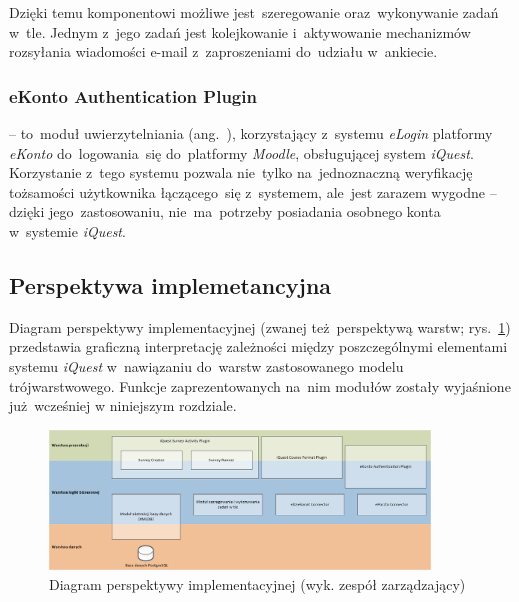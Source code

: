 Dzięki temu komponentowi możliwe jest~szeregowanie oraz~wykonywanie zadań w~tle. Jednym z~jego zadań jest kolejkowanie i~aktywowanie mechanizmów rozsyłania wiadomości e-mail z~zaproszeniami do~udziału w~ankiecie.

\subsubsection{eKonto Authentication Plugin}
\label{Chapter5425}

 -- to~moduł uwierzytelniania (ang.~), korzystający z~systemu \textit{eLogin} platformy \textit{eKonto} do~logowania~się do~platformy \textit{Moodle}, obsługującej system \textit{iQuest}. Korzystanie z~tego systemu pozwala nie~tylko na~jednoznaczną weryfikację tożsamości użytkownika łączącego~się z~systemem, ale~jest zarazem wygodne -- dzięki jego~zastosowaniu, nie~ma~potrzeby posiadania osobnego konta w~systemie \textit{iQuest}.

\subsection{Perspektywa implemetancyjna}
\label{Chapter543}

Diagram perspektywy implementacyjnej (zwanej też~perspektywą warstw; rys.~\ref{rys:PerspektywaImplementacyjna}) przedstawia graficzną interpretację zależności między poszczególnymi elementami systemu \textit{iQuest} w~nawiązaniu do~warstw zastosowanego modelu trójwarstwowego. Funkcje zaprezentowanych na~nim modułów zostały wyjaśnione już~wcześniej w niniejszym rozdziale.

\newpage
\begin{landscape}
\begin{figure}[H]
\centering\includegraphics[width=0.9\textwidth]{figures/Layers}
\caption{Diagram perspektywy implementacyjnej (wyk. zespół zarządzający)}\label{rys:PerspektywaImplementacyjna}
\end{figure}
\end{landscape}
\newpage

